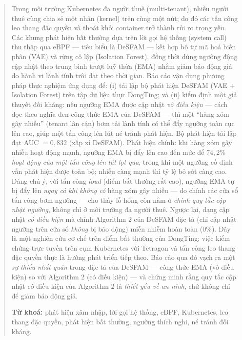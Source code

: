 \documentclass[12pt,a4paper]{article}
\begin{document}
\begin{abstract}
\noindent Trong môi trường Kubernetes đa người thuê (multi-tenant), nhiều người thuê cùng chia sẻ một nhân (kernel) trên cùng một nút; do đó các tấn công leo thang đặc quyền và thoát khỏi container trở thành rủi ro trọng yếu. Các khung phát hiện bất thường dựa trên lời gọi hệ thống (system call) thu thập qua eBPF — tiêu biểu là DeSFAM — kết hợp bộ tự mã hoá biến phân (VAE) và rừng cô lập (Isolation Forest), đồng thời dùng ngưỡng động cập nhật theo trung bình trượt luỹ thừa (EMA) nhằm giảm báo động giả do hành vi lành tính trôi dạt theo thời gian. Báo cáo vận dụng phương pháp thực nghiệm ứng dụng để: (i) tái lập bộ phát hiện DeSFAM (VAE + Isolation Forest) trên tập dữ liệu thực DongTing; và (ii) kiểm định một giả thuyết đối kháng: nếu ngưỡng EMA được cập nhật \textit{vô điều kiện} — cách đọc theo nghĩa đen công thức EMA của DeSFAM — thì một ``hàng xóm gây nhiễu'' (tenant lân cận) bơm tải lành tính có thể đẩy ngưỡng toàn cục lên cao, giúp một tấn công lén lút né tránh phát hiện. Bộ phát hiện tái lập đạt AUC $=0{,}832$ (xấp xỉ DeSFAM). Phát hiện chính: khi hàng xóm gây nhiễu hoạt động mạnh, ngưỡng EMA bị đẩy lên cao đến mức để \textit{$74{,}2\%$ hoạt động của một tấn công lén lút lọt qua}, trong khi một ngưỡng cố định vẫn phát hiện được toàn bộ; nhiễu càng mạnh thì tỷ lệ bỏ sót càng cao. Đáng chú ý, với tấn công \textit{loud} (điểm bất thường rất cao), ngưỡng EMA tự bị đẩy lên \textit{ngay cả khi không có} hàng xóm gây nhiễu — do chính các cửa sổ tấn công bơm ngưỡng — cho thấy lỗ hổng còn nằm ở \textit{chính quy tắc cập nhật ngưỡng}, không chỉ ở môi trường đa người thuê. Ngược lại, dạng cập nhật \textit{có điều kiện} mà chính Algorithm 2 của DeSFAM đặc tả (chỉ cập nhật ngưỡng trên cửa sổ \textit{không} bị báo động) miễn nhiễm hoàn toàn ($0\%$). Đây là một nghiên cứu cơ chế trên điểm bất thường của DongTing; việc kiểm chứng trực tuyến trên cụm Kubernetes với Tetragon và tấn công leo thang đặc quyền thực là hướng phát triển tiếp theo. Báo cáo qua đó vạch ra một \textit{sự thiếu nhất quán} trong đặc tả của DeSFAM — công thức EMA (vô điều kiện) so với Algorithm 2 (có điều kiện) — và chứng minh rằng quy tắc cập nhật có điều kiện của Algorithm 2 là \textit{thiết yếu về an ninh}, chứ không chỉ để giảm báo động giả.

\medskip
\noindent\textbf{Từ khoá:} phát hiện xâm nhập, lời gọi hệ thống, eBPF, Kubernetes, leo thang đặc quyền, phát hiện bất thường, ngưỡng thích nghi, né tránh đối kháng.
\end{abstract}

\newpage
\tableofcontents
\newpage













\end{document}
